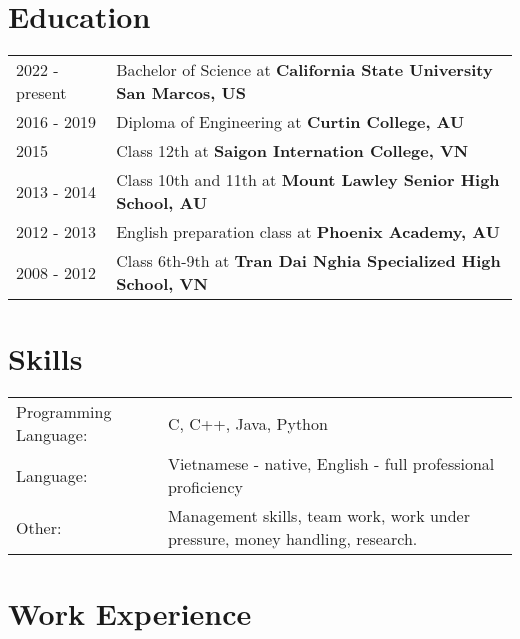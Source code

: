 \documentclass[a4paper,12pt]{article}
\begin{document}
\section{Education}
\begin{tabularx}{\linewidth}{@{}l X@{}}	
2022 - present & Bachelor of Science at \textbf{California State University San Marcos, US}\\

2016 - 2019 & Diploma of Engineering at \textbf{Curtin College, AU}\\ 

2015 & Class 12th at \textbf{Saigon Internation College, VN} \\

2013 - 2014 & Class 10th and 11th at \textbf{Mount Lawley Senior High School, AU} \\

2012 - 2013 & English preparation class at \textbf{Phoenix Academy, AU} \\

2008 - 2012 & Class 6th-9th at \textbf{Tran Dai Nghia Specialized High School, VN} \\
\end{tabularx}


\section{Skills}
\begin{tabularx}{\linewidth}{@{}l X@{}}
Programming Language: &  \normalsize{C, C++, Java, Python}\\
Language:  &  \normalsize{Vietnamese - native, English - full professional proficiency}\\  
Other:& Management skills, team work, work under pressure, money handling, research. \\
\end{tabularx}

\section{Work Experience}
\end{document}
